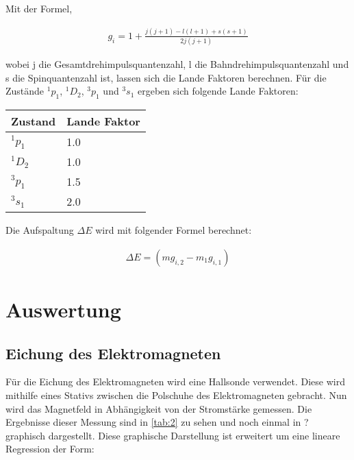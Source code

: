 Mit der Formel,

\begin{align}
    g_i = 1 + \frac{j(j + 1) - l(l+1) + s(s+1)}{2j(j+1)}
\end{align}

wobei j die Gesamtdrehimpulsquantenzahl, l die Bahndrehimpulsquantenzahl und s die Spinquantenzahl ist, lassen sich die Lande Faktoren berechnen.
Für die Zustände $^1p_1$, $^1D_2$, $^3p_1$ und $^3s_1$ ergeben sich folgende Lande Faktoren:

\begin{minipage}{\linewidth}
    \begin{table}[H]
        \centering
    \begin{tabular}{ll}
        \toprule
        Zustand & Lande Faktor \\
        \midrule
        $^1p_1$ & 1.0 \\
        $^1D_2$ & 1.0 \\
        $^3p_1$ & 1.5 \\
        $^3s_1$ & 2.0 \\
        \bottomrule   
    \end{tabular}
    
    \label{tab:1}
\end{table}
\end{minipage}

Die Aufspaltung $\Delta E$ wird mit folgender Formel berechnet:

\begin{align}
    \Delta E = (mg_{i,2}-m_1g_{i,1})
\end{align}


\section{Auswertung}

\subsection{Eichung des Elektromagneten}

Für die Eichung des Elektromagneten wird eine Hallsonde verwendet. Diese wird mithilfe eines Stativs zwischen die Polschuhe des Elektromagneten gebracht. Nun wird das Magnetfeld in Abhängigkeit von der Stromstärke gemessen.
Die Ergebnisse dieser Messung sind in \ref{tab:2} zu sehen und noch einmal in ? graphisch dargestellt. Diese graphische Darstellung ist erweitert um eine lineare Regression der Form:

